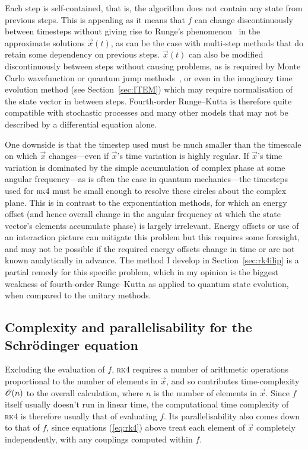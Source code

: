 Each step is self-contained, that is, the algorithm does not contain any state from previous steps. This is appealing as it means that $f$ can change discontinuously between timesteps without giving rise to Runge's phenomenon~\cite{dahlquist2003numerical} in the approximate solutions $\vec x(t)$, as can be the case with multi-step methods that do retain some dependency on previous steps.
$\vec x(t)$ can also be modified discontinuously between steps without causing problems, as is required by Monte Carlo wavefunction or quantum jump methods~\cite{molmer_monte_1996, plenio_quantum-jump_1998}, or even in the imaginary time evolution method (see Section~\ref{sec:ITEM}) which may require normalisation of the state vector in between steps. Fourth-order Runge--Kutta is therefore quite compatible with stochastic processes and many other models that may not be described by a differential equation alone.

One downside is that the timestep used must be much smaller than the timescale on which $\vec x$ changes---even if $\vec x$'s time variation is highly regular. If $\vec x$'s time variation is dominated by the simple accumulation of complex phase at some angular frequency---as is often the case in quantum mechanics---the timesteps used for \textsc{rk4} must be small enough to resolve these circles about the complex plane. This is in contrast to the exponentiation methods, for which an energy offset (and hence overall change in the angular frequency at which the state vector's elements accumulate phase) is largely irrelevant. Energy offsets or use of an interaction picture can mitigate this problem but this requires some foresight, and may not be possible if the required energy offsets change in time or are not known analytically in advance. The method I develop in Section~\ref{sec:rk4ilip} is a partial remedy for this specific problem, which in my opinion is the biggest weakness of fourth-order Runge--Kutta as applied to quantum state evolution, when compared to the unitary methods.

\subsection{Complexity and parallelisability for the Schr\"odinger equation}

Excluding the evaluation of $f$, \textsc{rk4} requires a number of arithmetic operations proportional to the number of elements in $\vec x$, and so contributes time-complexity $\mathscr{O}(n)$ to the overall calculation, where $n$ is the number of elements in $\vec x$. Since $f$ itself usually doesn't run in linear time, the computational time complexity of \textsc{rk4} is therefore usually that of evaluating $f$. Its parallelisability also comes down to that of $f$, since equations (\ref{eq:rk4}) above treat each element of $\vec x$ completely independently, with any couplings computed within $f$.

